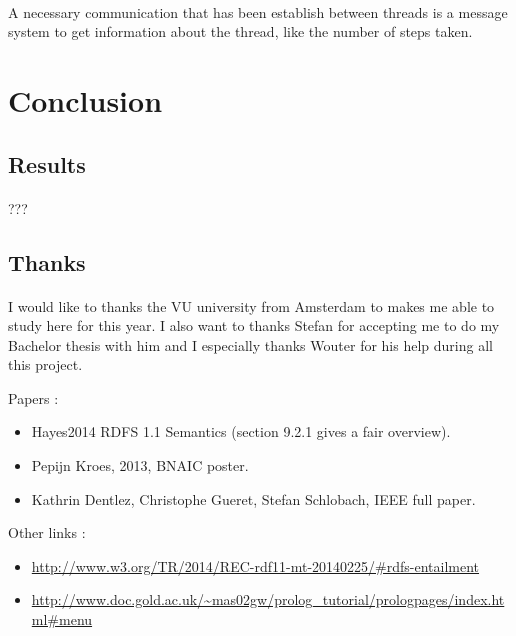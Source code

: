 \documentclass{article}
\newenvironment{itemh}[0]{\begin{itemize}[label=$\heartsuit$, font=\color{mygray} \small]}{\end{itemize}}
\begin{document}
		\paragraph{}
			A necessary communication that has been establish between threads is a message system to get information about the thread,
			like the number of steps taken.

\newpage
\section{Conclusion}
	\subsection{Results}
		\paragraph{}
			???
	\subsection{Thanks}
		\paragraph{}
			I would like to thanks the VU university from Amsterdam to makes me able to study here for this year.
			I also want to thanks Stefan for accepting me to do my Bachelor thesis with him
			and I especially thanks Wouter for his help during all this project.

\newpage


	Papers :
		\begin{itemh}
			\item Hayes2014 RDFS 1.1 Semantics (section 9.2.1 gives a fair overview).
			\item Pepijn Kroes, 2013, BNAIC poster.
			\item Kathrin Dentlez, Christophe Gueret, Stefan Schlobach, IEEE full paper.
		\end{itemh}
	Other links :
		\begin{itemh}
			\item\url{http://www.w3.org/TR/2014/REC-rdf11-mt-20140225/#rdfs-entailment}
			\item \url{http://www.doc.gold.ac.uk/~mas02gw/prolog_tutorial/prologpages/index.html#menu}
		\end{itemh}
\end{document}
